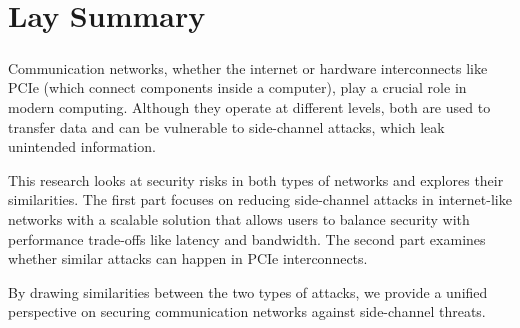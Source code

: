 \chapter{Lay Summary}


\paragraph{} Communication networks, whether the internet or hardware interconnects like PCIe (which connect components inside a computer), play a crucial role in modern computing. 
Although they operate at different levels, both are used to transfer data and can be vulnerable to side-channel attacks, which leak unintended information.

This research looks at security risks in both types of networks and explores their similarities. 
The first part focuses on reducing side-channel attacks in internet-like networks with a scalable solution that allows users to balance security with performance trade-offs like latency and bandwidth. 
The second part examines whether similar attacks can happen in PCIe interconnects.

By drawing similarities between the two types of attacks, we provide a unified perspective on securing communication networks against side-channel threats.
